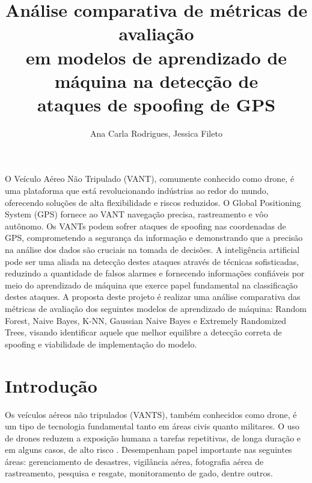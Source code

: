 \documentclass[12pt]{article}
\title{Análise comparativa de métricas de avaliação\\
em modelos de aprendizado de máquina na detecção de\\
ataques de spoofing de GPS
}
\author{Ana Carla Rodrigues\inst{1}, Jessica Fileto\inst{1}}
\begin{document}
\maketitle
     
\begin{resumo} 
O Veículo Aéreo Não Tripulado (VANT), comumente conhecido como drone, é uma
plataforma que está revolucionando indústrias ao redor do mundo, oferecendo 
soluções de alta flexibilidade e riscos reduzidos. O Global Positioning System 
(GPS) fornece ao VANT navegação precisa, rastreamento e vôo autônomo. Os VANTs 
podem sofrer ataques de spoofing nas coordenadas de GPS, comprometendo a 
segurança da informação e demonstrando que a precisão na análise dos dados são 
cruciais na tomada de decisões. A inteligência artificial pode ser uma aliada 
na detecção destes ataques através de técnicas sofisticadas, reduzindo a 
quantidade de falsos alarmes e fornecendo informações confiáveis por meio do 
aprendizado de máquina que exerce papel fundamental na classificação destes 
ataques. A proposta deste projeto é realizar uma análise comparativa das 
métricas de avaliação dos seguintes modelos de aprendizado de máquina: Random 
Forest, Naive Bayes, K-NN, Gaussian Naive Bayes e Extremely Randomized Trees, visando identificar 
aquele que melhor equilibre a detecção correta de spoofing e viabilidade de 
implementação do modelo.
\end{resumo}

\section{Introdução}


Os veículos aéreos não tripulados (VANTS), também conhecidos como drone,
é um tipo de tecnologia fundamental tanto em áreas civis quanto militares.
O uso de drones reduzem a exposição humana a tarefas repetitivas, de longa duração e em alguns casos, de alto risco \cite{dialogos}.
Desempenham papel importante nas seguintes áreas: gerenciamento de desastres, vigilância aérea, fotografia aérea de rastreamento, pesquisa e resgate,
monitoramento de gado, dentre outros. \cite{titounaLightweightSecurityTechnique2021} 

\end{document}
